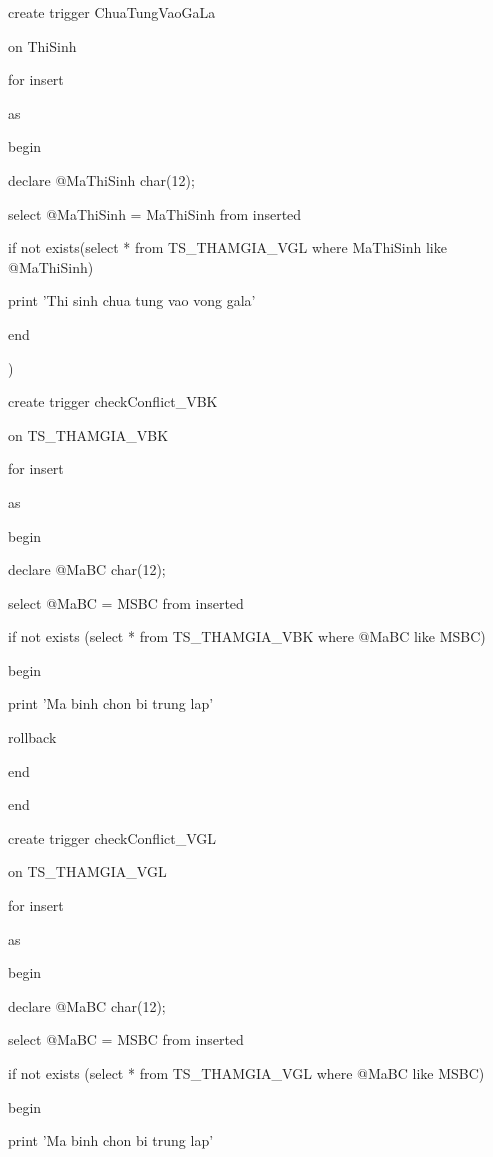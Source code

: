 \documentclass{report}
\begin{document}
\bigskip

create trigger ChuaTungVaoGaLa

on ThiSinh

for insert

as

begin
	
	\setlength{\parindent}{1.5cm}
	declare @MaThiSinh char(12);
	
	select @MaThiSinh = MaThiSinh from inserted

	if not exists(select * from TS\_THAMGIA\_VGL where MaThiSinh like @MaThiSinh)
	
	\setlength{\parindent}{2.5cm}
		print 'Thi sinh chua tung vao vong gala'
		
	\setlength{\parindent}{0.5cm}	
end

)


		
\setlength{\parindent}{0.5cm}	
create trigger checkConflict\_VBK

on	TS\_THAMGIA\_VBK

for insert

as

begin

	\setlength{\parindent}{1.5cm}	
	declare @MaBC char(12);
	
	select @MaBC = MSBC from inserted
	
	if not exists (select * from TS\_THAMGIA\_VBK where @MaBC like MSBC)
	
	begin
	
		\setlength{\parindent}{2.5cm}
		print 'Ma binh chon bi trung lap'
		
		rollback
	
		
	\setlength{\parindent}{1.5cm}		
	end
		
	\setlength{\parindent}{0.5cm}	
end

\bigskip

create trigger checkConflict\_VGL

on	TS\_THAMGIA\_VGL 

for insert

as

begin

	\setlength{\parindent}{1.5cm}
	declare @MaBC char(12);
	
	select @MaBC = MSBC from inserted
	
	if not exists (select * from TS\_THAMGIA\_VGL where @MaBC like MSBC)
	
	begin
	
		\setlength{\parindent}{2.5cm}
		print 'Ma binh chon bi trung lap'
		
\end{document}
